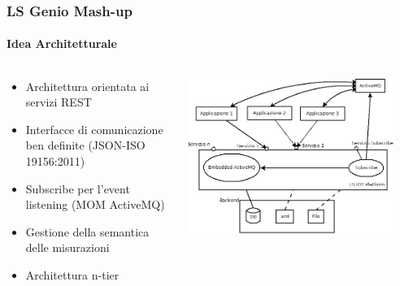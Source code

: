 \documentclass{beamer}
\begin{document}
\begin{frame}
\frametitle{LS Genio Mash-up}
\framesubtitle{Idea Architetturale}
\begin{columns}[T] %
	\begin{column}{.52\textwidth}
		\begin{itemize}
			\item Architettura orientata ai servizi REST
			\item Interfacce di comunicazione ben definite (JSON-ISO 19156:2011) 
			\item Subscribe per l'event listening (MOM ActiveMQ)
			\item Gestione della semantica delle misurazioni
			\item Architettura n-tier 
		\end{itemize}
	\end{column}%
	\hfill%
	\begin{column}{.48\textwidth}
		\includegraphics[width=0.9\textwidth]{images/architettura_piattaforma.png}
	\end{column}%
\end{columns}
\end{frame}
\end{document}
